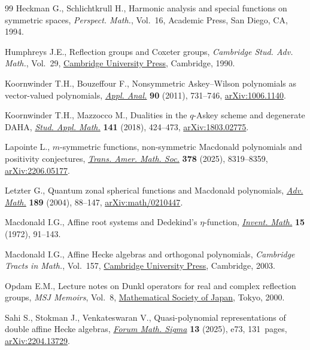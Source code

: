 \documentclass[10pt,a4paper]{amsart}
\theoremstyle{definition}
\numberwithin{equation}{section}
\begin{document}
\begin{thebibliography}{99}
Heckman G., Schlichtkrull H., Harmonic analysis and special functions on
 symmetric spaces, \textit{Perspect. Math.}, Vol.~16, Academic Press, San
 Diego, CA, 1994.

Humphreys J.E., Reflection groups and {C}oxeter groups, \textit{Cambridge Stud.
 Adv. Math.}, Vol.~29,
 \href{https://doi.org/10.1017/CBO9780511623646}{Cambridge University Press},
 Cambridge, 1990.

Koornwinder T.H., Bouzeffour F., Nonsymmetric {A}skey--{W}ilson polynomials as
 vector-valued polynomials,
 \href{https://doi.org/10.1080/00036811.2010.502117}{\textit{Appl. Anal.}}
 \textbf{90} (2011), 731--746,
 \href{http://arxiv.org/abs/1006.1140}{arXiv:1006.1140}.

Koornwinder T.H., Mazzocco M., Dualities in the {$q$}-{A}skey scheme and
 degenerate {DAHA}, \href{https://doi.org/10.1111/sapm.12229}{\textit{Stud.
 Appl. Math.}} \textbf{141} (2018), 424--473,
 \href{http://arxiv.org/abs/1803.02775}{arXiv:1803.02775}.

Lapointe L., {$m$}-symmetric functions, non-symmetric {M}acdonald polynomials
 and positivity conjectures,
 \href{https://doi.org/10.1090/tran/9351}{\textit{Trans. Amer. Math. Soc.}}
 \textbf{378} (2025), 8319--8359,
 \href{http://arxiv.org/abs/2206.05177}{arXiv:2206.05177}.

Letzter G., Quantum zonal spherical functions and {M}acdonald polynomials,
 \href{https://doi.org/10.1016/j.aim.2003.11.007}{\textit{Adv. Math.}}
 \textbf{189} (2004), 88--147,
 \href{http://arxiv.org/abs/math/0210447}{arXiv:math/0210447}.

Macdonald I.G., Affine root systems and {D}edekind's {$\eta $}-function,
 \href{https://doi.org/10.1007/BF01418931}{\textit{Invent. Math.}} \textbf{15}
 (1972), 91--143.

Macdonald I.G., Affine {H}ecke algebras and orthogonal polynomials,
 \textit{Cambridge Tracts in Math.}, Vol.~157,
 \href{https://doi.org/10.1017/CBO9780511542824}{Cambridge University Press},
 Cambridge, 2003.

Opdam E.M., Lecture notes on {D}unkl operators for real and complex reflection
 groups, \textit{MSJ Memoirs}, Vol.~8,
 \href{https://doi.org/10.2969/msjmemoirs/008010000}{Mathematical Society of
 Japan}, Tokyo, 2000.

Sahi S., Stokman J., Venkateswaran V., Quasi-polynomial representations of
 double affine {H}ecke algebras,
 \href{https://doi.org/10.1017/fms.2025.33}{\textit{Forum Math. Sigma}}
 \textbf{13} (2025), e73, 131~pages,
 \href{http://arxiv.org/abs/2204.13729}{arXiv:2204.13729}.


\end{thebibliography}
\end{document}
